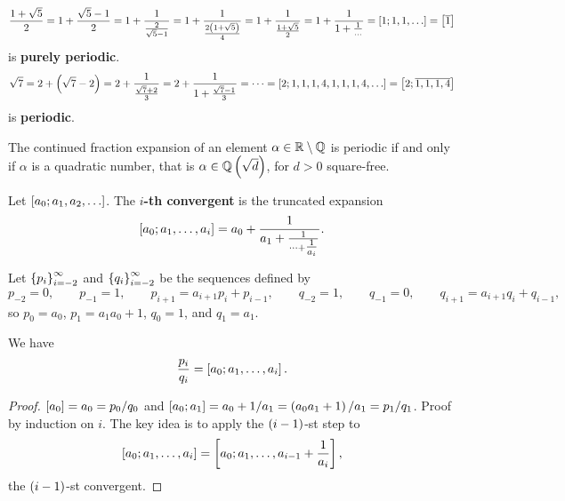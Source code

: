 \pagebreak

\begin{example*}
$$ \dfrac{1 + \sqrt{5}}{2} = 1 + \dfrac{\sqrt{5} - 1}{2} = 1 + \dfrac{1}{\tfrac{2}{\sqrt{5} - 1}} = 1 + \dfrac{1}{\tfrac{2\rb{1 + \sqrt{5}}}{4}} = 1 + \dfrac{1}{\tfrac{1 + \sqrt{5}}{2}} = 1 + \dfrac{1}{1 + \tfrac{1}{\dots}} = \sb{1; 1, 1, \dots} = \sb{\overline{1}} $$
is \textbf{purely periodic}.
$$ \sqrt{7} = 2 + \rb{\sqrt{7} - 2} = 2 + \dfrac{1}{\tfrac{\sqrt{7} + 2}{3}} = 2 + \dfrac{1}{1 + \tfrac{\sqrt{7} - 1}{3}} = \dots = \sb{2; 1, 1, 1, 4, 1, 1, 1, 4, \dots} = \sb{2; \overline{1, 1, 1, 4}} $$
is \textbf{periodic}.
\end{example*}

\begin{theorem}
The continued fraction expansion of an element $ \alpha \in \R \setminus \Q $ is periodic if and only if $ \alpha $ is a quadratic number, that is $ \alpha \in \Q\rb{\sqrt{d}} $, for $ d > 0 $ square-free.
\end{theorem}


\begin{definition}
Let $ \sb{a_0; a_1, a_2, \dots} $. The \textbf{$ i $-th convergent} is the truncated expansion
$$ \sb{a_0; a_1, \dots, a_i} = a_0 + \dfrac{1}{a_1 + \tfrac{1}{\dots + \tfrac{1}{a_i}}}. $$
\end{definition}

\begin{definition}
Let $ \cb{p_i}_{i = -2}^\infty $ and $ \cb{q_i}_{i = -2}^\infty $ be the sequences defined by
$$ p_{-2} = 0, \qquad p_{-1} = 1, \qquad p_{i + 1} = a_{i + 1}p_i + p_{i - 1}, \qquad q_{-2} = 1, \qquad q_{-1} = 0, \qquad q_{i + 1} = a_{i + 1}q_i + q_{i - 1}, $$
so $ p_0 = a_0 $, $ p_1 = a_1a_0 + 1 $, $ q_0 = 1 $, and $ q_1 = a_1 $.
\end{definition}

\begin{lemma}
We have
$$ \dfrac{p_i}{q_i} = \sb{a_0; a_1, \dots, a_i}. $$
\end{lemma}

\begin{proof}
$ \sb{a_0} = a_0 = p_0 / q_0 $ and $ \sb{a_0; a_1} = a_0 + 1 / a_1 = \rb{a_0a_1 + 1} / a_1 = p_1 / q_1 $. Proof by induction on $ i $. The key idea is to apply the $ \rb{i - 1} $-st step to
$$ \sb{a_0; a_1, \dots, a_i} = \sb{a_0; a_1, \dots, a_{i - 1} + \dfrac{1}{a_i}}, $$
the $ \rb{i - 1} $-st convergent.
\end{proof}

